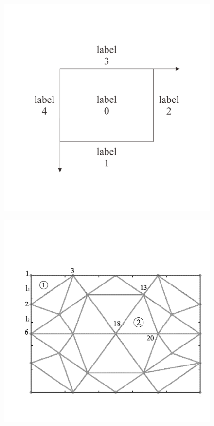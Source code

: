 \documentclass[a4paper,10pt]{article}
\begin{document}
\begin{figure}[h!]
	\centering
	\includegraphics[width=0.53\linewidth]{picture/labelPict}
	\caption{}
	\label{fig:labelpict}
\end{figure}
\begin{figure}[h!]
	\centering
	\includegraphics[width=0.7\linewidth]{picture/trianglePict}
	\caption{}
	\label{fig:trianglepict}
\end{figure}



%
\end{document}
